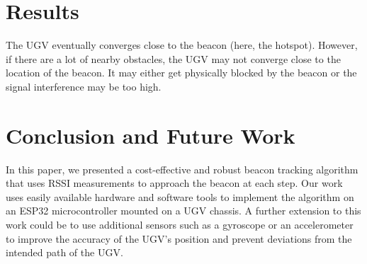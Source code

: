 \documentclass[conference]{IEEEtran}
\begin{document}
\section{Results}
\label{sec:results}
The UGV eventually converges close to the beacon (here, the hotspot). However,
if there are a lot of nearby obstacles, the UGV may not converge close to the
location of the beacon. It may either get physically blocked by the beacon or
the signal interference may be too high.

\section{Conclusion and Future Work}
\label{sec:conclusion}

In this paper, we presented a cost-effective and robust beacon tracking
algorithm that uses RSSI measurements to approach the beacon at each step. Our
work uses easily available hardware and software tools to implement the
algorithm on an ESP32 microcontroller mounted on a UGV chassis. A further
extension to this work could be to use additional sensors such as a gyroscope or
an accelerometer to improve the accuracy of the UGV's position and prevent
deviations from the intended path of the UGV.



\end{document}
